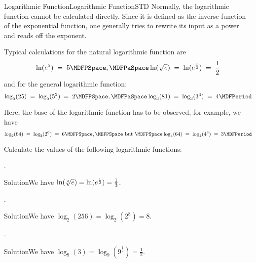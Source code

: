 \begin{MXContent}{Logarithmic Function}{Logarithmic Function}{STD}
Normally, the logarithmic function cannot be calculated directly. Since it is defined as the inverse function 
of the exponential function, one generally tries to rewrite its input as a power and reads off the exponent. 

\begin{MExample}
Typical calculations for the natural logarithmic function are
$$
\ln(\MEU^5) \;=\; 5\MDFPSpace, \MDFPaSpace \ln(\sqrt{\MEU}) \;=\; \ln(\MEU^{\frac12}) \;=\; \frac12
$$
and for the general logarithmic function:
$$
\log_5(25) \;=\; \log_5(5^2) \;=\; 2 \MDFPSpace, \MDFPaSpace \log_3(81) \;=\; \log_3(3^4) \;=\; 4 \MDFPeriod
$$
\end{MExample}

Here, the base of the logarithmic function has to be observed, for example, we have
$$
\log_2(64) \;=\; \log_2(2^6) \;=\; 6 \MDFPSpace,\MDFPSpace \text{ but }\MDFPSpace
\log_4(64) \;=\; \log_4(4^3) \;=\; 3 \MDFPeriod
$$

\begin{MExercise}
Calculate the values of the following logarithmic functions:
\begin{MExerciseItems}
\item{. \begin{MHint}{Solution}We have $\ln(\sqrt[3]{e})=\ln(e^{\frac13})=\frac13$.\end{MHint}}
\item{. \begin{MHint}{Solution}We have $\log_2(256)=\log_2(2^8)=8$.\end{MHint}}
\item{. \begin{MHint}{Solution}We have $\log_9(3)=\log_9(9^{\frac12})=\frac12$.\end{MHint}}
\end{MExerciseItems}
\end{MExercise}


\end{MXContent}
